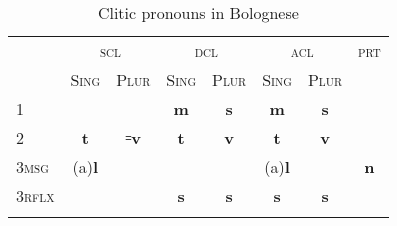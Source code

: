 \documentclass[output=paper,colorlinks,citecolor=brown]{langscibook}
\begin{document}

\begin{table}
\caption{Clitic pronouns in Bolognese}
\label{tab:1:CLs}
 \begin{tabular}{l  cc cc cc c}
  \lsptoprule
  		& \multicolumn{2}{c}{\textsc{scl}} & \multicolumn{2}{c}{\textsc{dcl}} & \multicolumn{2}{c}{\textsc{acl}} & \textsc{prt}\\
		& \textsc{Sing} & \textsc{Plur} & \textsc{Sing} & \textsc{Plur} & \textsc{Sing} & \textsc{Plur} & \\
  \midrule
  1  &    &   & \textbf{m} & \textbf{s} & \textbf{m} & \textbf{s} & \\%
  2  &   \textbf{t} & ꞊\textbf{v} &  \textbf{t} & \textbf{v} &  \textbf{t} & \textbf{v} & \\
  3\textsc{msg} & {\color{gray}(a)}\textbf{l} &  & & & {\color{gray}(a)}\textbf{l} &  & \textbf{n}\\
  3\textsc{rflx} &  &   & \textbf{s} & \textbf{s} & \textbf{s} & \textbf{s} &\\
  \lspbottomrule
 \end{tabular}
\end{table}
\end{document}
